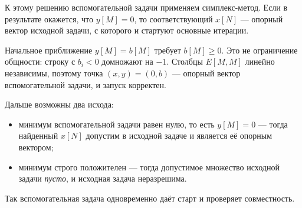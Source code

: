 К этому решению вспомогательной задачи применяем симплекс-метод. Если в результате
окажется, что $y[M] = 0$, то соответствующий $x[N]$ — опорный вектор исходной задачи,
с которого и стартуют основные итерации.

\begin{idea}
Начальное приближение $y[M] = b[M]$ требует $b[M] \ge 0$. Это не ограничение
общности: строку с $b_i < 0$ домножают на $-1$. Столбцы $E[M,M]$ линейно независимы,
поэтому точка $(x, y) = (0, b)$ — опорный вектор вспомогательной задачи, и запуск
корректен.

Дальше возможны два исхода:
\begin{itemize}[nosep,left=0pt]
  \item минимум вспомогательной задачи равен нулю, то есть $y[M] = 0$ — тогда
        найденный $x[N]$ допустим в исходной задаче и является её опорным вектором;
  \item минимум строго положителен — тогда допустимое множество исходной задачи
        \emph{пусто}, и исходная задача неразрешима.
\end{itemize}
Так вспомогательная задача одновременно даёт старт и проверяет совместность.
\end{idea}
